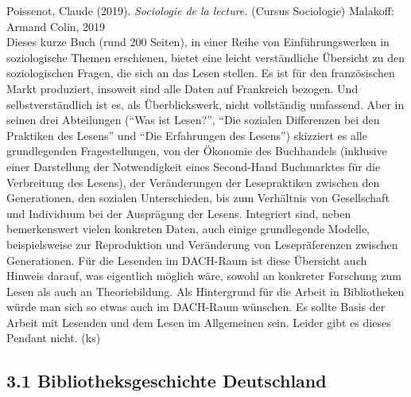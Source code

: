 \documentclass[a4paper,
fontsize=11pt,
oneside,
numbers=noperiodatend,
parskip=half-,
bibliography=totoc,
final
]{scrartcl}
\begin{document}
Poissenot, Claude (2019). \emph{Sociologie de la lecture.} (Cursus
Sociologie) Malakoff: Armand Colin, 2019\\
Dieses kurze Buch (rund 200 Seiten), in einer Reihe von
Einführungswerken in soziologische Themen erschienen, bietet eine leicht
verständliche Übersicht zu den soziologischen Fragen, die sich an das
Lesen stellen. Es ist für den französischen Markt produziert, insoweit
sind alle Daten auf Frankreich bezogen. Und selbstverständlich ist es,
als Überblickswerk, nicht vollständig umfassend. Aber in seinen drei
Abteilungen (``Was ist Lesen?'', ``Die sozialen Differenzen bei den
Praktiken des Lesens'' und ``Die Erfahrungen des Lesens'') skizziert es
alle grundlegenden Fragestellungen, von der Ökonomie des Buchhandels
(inklusive einer Darstellung der Notwendigkeit eines Second-Hand
Buchmarktes für die Verbreitung des Lesens), der Veränderungen der
Lesepraktiken zwischen den Generationen, den sozialen Unterschieden, bis
zum Verhältnis von Gesellschaft und Individuum bei der Ausprägung der
Lesens. Integriert sind, neben bemerkenswert vielen konkreten Daten,
auch einige grundlegende Modelle, beispielsweise zur Reproduktion und
Veränderung von Lesepräferenzen zwischen Generationen. Für die Lesenden
im DACH-Raum ist diese Übersicht auch Hinweis darauf, was eigentlich
möglich wäre, sowohl an konkreter Forschung zum Lesen als auch an
Theoriebildung. Als Hintergrund für die Arbeit in Bibliotheken würde man
sich so etwas auch im DACH-Raum wünschen. Es sollte Basis der Arbeit mit
Lesenden und dem Lesen im Allgemeinen sein. Leider gibt es dieses
Pendant nicht. (ks)

\hypertarget{bibliotheksgeschichte-deutschland}{%
\subsection{3.1 Bibliotheksgeschichte
Deutschland}\label{bibliotheksgeschichte-deutschland}}
\end{document}
